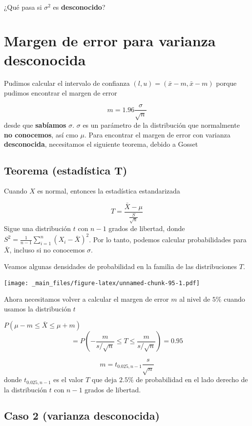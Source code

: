 \documentclass[
]{book}
\begin{document}
¿Qué pasa si \(\sigma^2\) es \textbf{desconocido}?

\hypertarget{margen-de-error-para-varianza-desconocida}{%
\section{Margen de error para varianza desconocida}\label{margen-de-error-para-varianza-desconocida}}

Pudimos calcular el intervalo de confianza \((l,u)=(\bar{x} -m, \bar{x} -m)\) porque pudimos encontrar el margen de error

\[m=1.96 \frac{\sigma}{\sqrt{n}}\]
desde que \textbf{sabíamos} \(\sigma\). \(\sigma\) es un parámetro de la distribución que normalmente \textbf{no conocemos}, así cmo \(\mu\). Para encontrar el margen de error con varianza \textbf{desconocida}, necesitamos el siguiente teorema, debido a Gosset

\hypertarget{teorema-estaduxedstica-t}{%
\subsection{Teorema (estadística T)}\label{teorema-estaduxedstica-t}}

Cuando \(X\) es normal, entonces la estadística estandarizada

\[T=\frac{\bar{X}-\mu}{\frac{S}{\sqrt{n}}}\]
Sigue una distribución \(t\) con \(n-1\) grados de libertad, donde \(S^2=\frac{1}{n-1} \sum_{i=1}^n (X_i-\bar{X})^2\). Por lo tanto, podemos calcular probabilidades para \(\bar{X}\), incluso si no conocemos \(\sigma\).

Veamos algunas densidades de probabilidad en la familia de las distribuciones \(T\).

\texttt{[image: \_main\_files/figure-latex/unnamed-chunk-95-1.pdf]}

Ahora necesitamos volver a calcular el margen de error \(m\) al nivel de \(5\%\) cuando usamos la distribución \(t\)

\(P(\mu-m \leq \bar{X} \leq\mu + m)\)
\[=P(-\frac{m}{s/\sqrt{n}} \leq T \leq\frac{m}{s/\sqrt{n}})=0.95\]

\[m=t_{0.025, n-1} \frac{s}{\sqrt{n}}\]
donde \(t_{0.025, n-1}\) es el valor \(T\) que deja \(2.5\%\) de probabilidad en el lado derecho de la distribución \(t\) con \(n-1\) grados de libertad.

\hypertarget{caso-2-varianza-desconocida}{%
\subsection{Caso 2 (varianza desconocida)}\label{caso-2-varianza-desconocida}}
\end{document}
